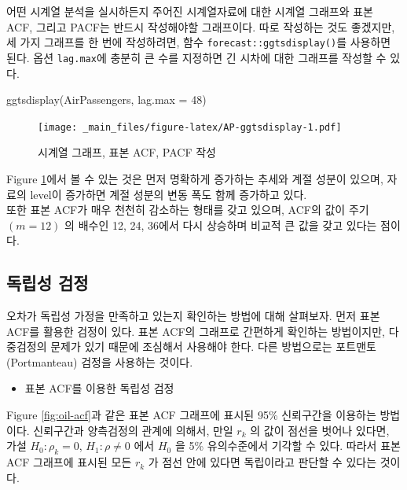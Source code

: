 \documentclass[
]{book}
\newenvironment{Shaded}{\begin{snugshade}}{\end{snugshade}}
\newcommand{\AttributeTok}[1]{\textcolor[rgb]{0.77,0.63,0.00}{#1}}
\newcommand{\DecValTok}[1]{\textcolor[rgb]{0.00,0.00,0.81}{#1}}
\newcommand{\FunctionTok}[1]{\textcolor[rgb]{0.00,0.00,0.00}{#1}}
\newcommand{\NormalTok}[1]{#1}
\providecommand{\tightlist}{%
  \setlength{\itemsep}{0pt}\setlength{\parskip}{0pt}}
\begin{document}
어떤 시계열 분석을 실시하든지 주어진 시계열자료에 대한 시계열 그래프와 표본 ACF, 그리고 PACF는
반드시 작성해야할 그래프이다.
따로 작성하는 것도 좋겠지만,
세 가지 그래프를 한 번에 작성하려면, 함수 \texttt{forecast::ggtsdisplay()}를 사용하면 된다.
옵션 \texttt{lag.max}에 충분히 큰 수를 지정하면 긴 시차에 대한 그래프를 작성할 수 있다.

\begin{Shaded}
\begin{Highlighting}[]
\FunctionTok{ggtsdisplay}\NormalTok{(AirPassengers, }\AttributeTok{lag.max =} \DecValTok{48}\NormalTok{)}
\end{Highlighting}
\end{Shaded}

\begin{figure}
\centering
\texttt{[image: \_main\_files/figure-latex/AP-ggtsdisplay-1.pdf]}
\caption{\label{fig:AP-ggtsdisplay}시계열 그래프, 표본 ACF, PACF 작성}
\end{figure}

Figure \ref{fig:AP-ggtsdisplay}에서 볼 수 있는 것은 먼저 명확하게 증가하는 추세와 계절 성분이 있으며,
자료의 level이 증가하면 계절 성분의 변동 폭도 함께 증가하고 있다.\\
또한 표본 ACF가 매우 천천히 감소하는 형태를 갖고 있으며,
ACF의 값이 주기 \((m = 12)\) 의 배수인 12, 24, 36에서 다시 상승하며 비교적 큰 값을 갖고 있다는 점이다.

\hypertarget{uxb3c5uxb9bduxc131-uxac80uxc815}{%
\subsection{독립성 검정}\label{uxb3c5uxb9bduxc131-uxac80uxc815}}

오차가 독립성 가정을 만족하고 있는지 확인하는 방법에 대해 살펴보자.
먼저 표본 ACF를 활용한 검정이 있다.
표본 ACF의 그래프로 간편하게 확인하는 방법이지만, 다중검정의 문제가 있기 때문에 조심해서 사용해야 한다.
다른 방법으로는 포트맨토 (Portmanteau) 검정을 사용하는 것이다.

\begin{itemize}
\tightlist
\item
  표본 ACF를 이용한 독립성 검정
\end{itemize}

Figure \ref{fig:oil-acf}과 같은 표본 ACF 그래프에 표시된 95\% 신뢰구간을 이용하는 방법이다.
신뢰구간과 양측검정의 관계에 의해서,
만일 \(r_{k}\) 의 값이 점선을 벗어나 있다면, 가설 \(H_{0}:\rho_{k} = 0\), \(H_{1}: \rho \ne 0\) 에서
\(H_{0}\) 을 5\% 유의수준에서 기각할 수 있다.
따라서 표본 ACF 그래프에 표시된 모든 \(r_{k}\) 가 점선 안에 있다면 독립이라고 판단할 수 있다는 것이다.
\end{document}
